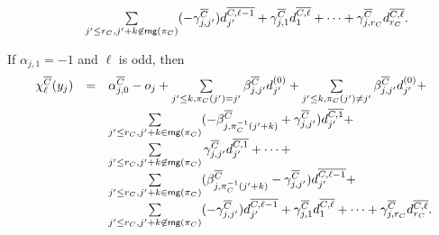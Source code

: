 \begin{itemize}
{\[\begin{array}{l c l}
%
& & \sum \limits_{j' \le r_C ,   j'+k \not \in \rng(\pi_C)} (-\gamma^{\circled{C}}_{j,j'}) d^{\circled{C , \ell  -  1}}_{j'} + \gamma^{\circled{C}}_{j, 1} d^{\circled{C , \ell}}_{1} + \dots + \gamma^{\circled{C}}_{j,r_C} d^{\circled{C , \ell}}_{r_C}.
\end{array} 
\]
\item If $\alpha_{j,1}=-1$ and $\ell$ is odd, then
\[
\begin{array}{l c l}
\smallskip
\chi^{\circled{C}}_{\ell}(y_j)  & = &  \alpha^{\circled{C}}_{j,0} - o_j + \sum \limits_{j' \le k, \pi_C(j')=j'} \beta^{\circled{C}}_{j,j'} d^{(0)}_{j'} +  \sum \limits_{j'\le k, \pi_C(j') \neq j'}  \beta^{\circled{C}}_{j,j'} d^{(0)}_{j'} +  \\
%
& & \sum \limits_{j' \le r_C ,  j'+k \in \rng(\pi_C)} ( -\beta^{\circled{C}}_{j, \pi_C^{-1}(j'+k)} +\gamma^{\circled{C}}_{j,j'}) d^{\circled{C , 1}}_{j'} + \\
%
& & \sum \limits_{j' \le r_C ,   j'+k \not \in \rng(\pi_C)} \gamma^{\circled{C}}_{j,j'} d^{\circled{C , 1}}_{j'} + \dots + \\
%
& & \sum \limits_{j' \le r_C ,  j'+k \in \rng(\pi_C)} (\beta^{\circled{C}}_{j, \pi_C^{-1}(j'+k)}-\gamma^{\circled{C}}_{j,j'}) d^{\circled{C , \ell  -  1}}_{j'} + \\
%
& & \sum \limits_{j' \le r_C ,   j'+k \not \in \rng(\pi_C)} (-\gamma^{\circled{C}}_{j,j'}) d^{\circled{C , \ell  -  1}}_{j'} + \gamma^{\circled{C}}_{j, 1} d^{\circled{C , \ell}}_{1} + \dots + \gamma^{\circled{C}}_{j,r_C} d^{\circled{C , \ell}}_{r_C}.
\end{array} 
\]
}
\end{itemize}
%
%
%
%



